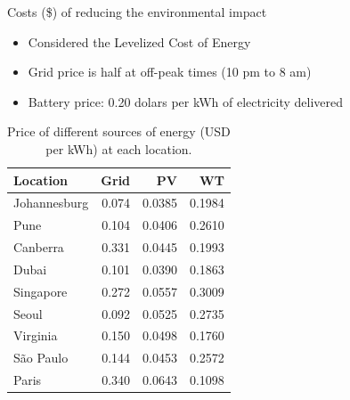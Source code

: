 \documentclass[Ligatures=TeX,table,svgnames,usetotalslideindicator,compress,10pt]{beamer}
\begin{document}
\begin{frame}{Costs (\$) of reducing the environmental impact}

  \begin{itemize}

  \item   Considered the Levelized Cost of Energy
  \item Grid price is half at off-peak times (10 pm to 8 am)
  \item   Battery price: 0.20 dolars per kWh of electricity delivered

  \end{itemize}
 
 \begin{table}
   
  \caption{Price of different sources of energy (USD per kWh) at each location.  }\label{tab:price_electricity_sources} \centering
  \small
  \begin{tabular}{|l|r|r|r|}
  \hline    
  \textbf{Location} &   \textbf{Grid} & \textbf{PV} & \textbf{WT} \\
  \hline
  Johannesburg & 0.074 & 0.0385  &  0.1984           \\
  \hline 
  Pune         &  0.104   & 0.0406  & 0.2610         \\
  \hline 
  Canberra     & 0.331    &  0.0445 & 0.1993         \\
  \hline
  Dubai        & 0.101      & 0.0390  &   0.1863     \\
  \hline
  Singapore    & 0.272    & 0.0557  & 0.3009         \\
  \hline     
  Seoul        & 0.092   & 0.0525  & 0.2735          \\
  \hline
  Virginia     & 0.150   &  0.0498 &  0.1760         \\
  \hline
  São Paulo    & 0.144   &  0.0453 & 0.2572          \\
  \hline 
  Paris        & 0.340   &  0.0643 & 0.1098          \\
  \hline
\end{tabular}
\end{table}

\end{frame}
\end{document}
